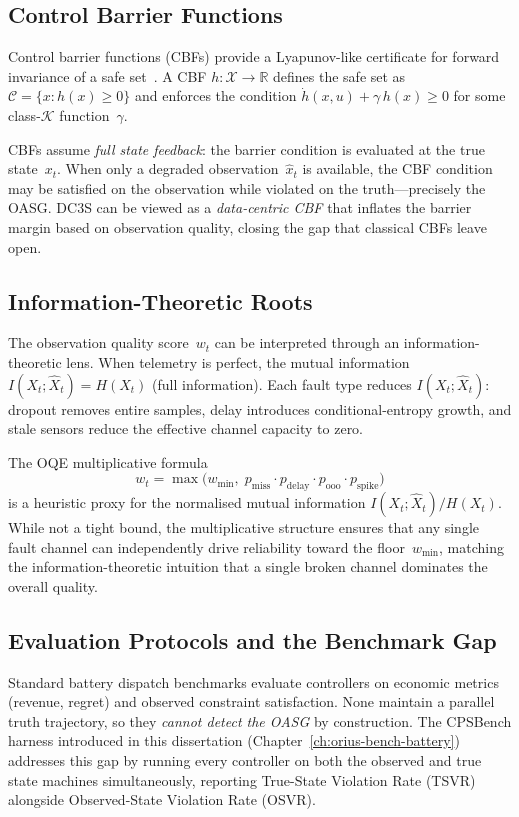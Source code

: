 \subsection{Control Barrier Functions}

Control barrier functions (CBFs) provide a Lyapunov-like certificate for
forward invariance of a safe set~\cite{ames2019control}.  A CBF
$h : \mathcal{X} \to \mathbb{R}$ defines the safe set as
$\mathcal{C} = \{x : h(x) \ge 0\}$ and enforces the condition
$\dot{h}(x, u) + \gamma\, h(x) \ge 0$ for some class-$\mathcal{K}$
function~$\gamma$.

CBFs assume \emph{full state feedback}: the barrier condition is evaluated
at the true state~$x_t$.  When only a degraded observation~$\hat{x}_t$ is
available, the CBF condition may be satisfied on the observation while
violated on the truth---precisely the OASG.  DC3S can be viewed as a
\emph{data-centric CBF} that inflates the barrier margin based on
observation quality, closing the gap that classical CBFs leave open.

\subsection{Information-Theoretic Roots}

The observation quality score~$w_t$ can be interpreted through an
information-theoretic lens.  When telemetry is perfect, the mutual
information $I(X_t; \hat{X}_t) = H(X_t)$ (full information).  Each fault
type reduces $I(X_t; \hat{X}_t)$: dropout removes entire samples, delay
introduces conditional-entropy growth, and stale sensors reduce the
effective channel capacity to zero.

The OQE multiplicative formula
\[
  w_t = \max\!\bigl(w_{\min},\;
  p_{\mathrm{miss}} \cdot p_{\mathrm{delay}} \cdot p_{\mathrm{ooo}} \cdot p_{\mathrm{spike}}\bigr)
\]
is a heuristic proxy for the normalised mutual information
$I(X_t; \hat{X}_t) / H(X_t)$.  While not a tight bound, the
multiplicative structure ensures that any single fault channel can
independently drive reliability toward the floor~$w_{\min}$, matching
the information-theoretic intuition that a single broken channel
dominates the overall quality.

\subsection{Evaluation Protocols and the Benchmark Gap}

Standard battery dispatch benchmarks evaluate controllers on economic
metrics (revenue, regret) and observed constraint satisfaction.  None
maintain a parallel truth trajectory, so they \emph{cannot detect the
OASG} by construction.  The CPSBench harness introduced in this
dissertation (Chapter~\ref{ch:orius-bench-battery}) addresses this gap by
running every controller on both the observed and true state machines
simultaneously, reporting True-State Violation Rate (TSVR) alongside
Observed-State Violation Rate (OSVR).

